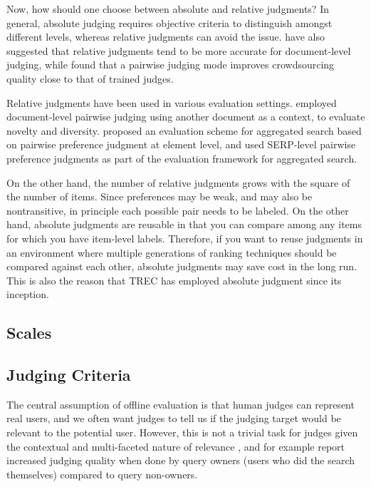 
Now, how should one choose between absolute and relative judgments? In general, absolute judging requires objective criteria to distinguish amongst different levels, whereas relative judgments can avoid the issue. \cite{CarteretteBCD08} have also suggested that relative judgments tend to be more accurate for document-level judging, while \cite{Kazai:2013} found that a pairwise judging mode improves crowdsourcing quality close to that of trained judges.

Relative judgments have been used in various evaluation settings. \cite{Chandar2013} employed document-level pairwise judging using another document as a context, to evaluate novelty and diversity. \cite{Arguello:2011} proposed an evaluation scheme for aggregated search based on pairwise preference judgment at element level, and \cite{Zhou:2012} used SERP-level pairwise preference judgments as part of the evaluation framework for aggregated search.

On the other hand, the number of relative judgments grows with the square of the number of items. Since preferences may be weak, and may also be nontransitive, in principle each possible pair needs to be labeled. On the other hand, absolute judgments are reusable in that you can compare among any items for which you have item-level labels. Therefore, if you want to reuse judgments in an environment where multiple generations of ranking techniques should be compared against each other, absolute judgments may save cost in the long run. This is also the reason that TREC has employed absolute judgment since its inception.

\subsection{Scales}


\subsection{Judging Criteria}
The central assumption of offline evaluation is that human judges can represent real users, and we often want judges to tell us if the judging target would be relevant to the potential user. However, this is not a trivial task for judges given the contextual and multi-faceted nature of relevance \citep{Borlund:2003}, and for example \cite{Chouldechova:2013} report increased judging quality when done by query owners (users who did the search themselves) compared to query non-owners.

